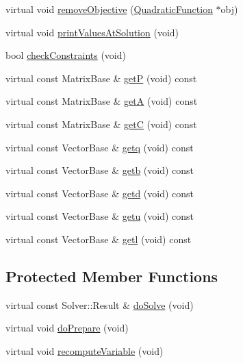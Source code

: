 \begin{DoxyCompactItemize}
\item 
virtual void \hyperlink{classocra_1_1CmlQuadraticSolver_a83d20013d6a9ff7c5855ee0ff2391190}{remove\+Objective} (\hyperlink{classocra_1_1QuadraticFunction}{Quadratic\+Function} $\ast$obj)
\item 
virtual void \hyperlink{classocra_1_1CmlQuadraticSolver_aed7554d599282ef5e8a7567b73b822b8}{print\+Values\+At\+Solution} (void)
\item 
bool \hyperlink{classocra_1_1CmlQuadraticSolver_a8077e7d9f2017f0f176324bb04cb5cd1}{check\+Constraints} (void)
\item 
virtual const Matrix\+Base \& \hyperlink{classocra_1_1CmlQuadraticSolver_afe5745b7cf19ebdfb03e389f3c7caf26}{getP} (void) const 
\item 
virtual const Matrix\+Base \& \hyperlink{classocra_1_1CmlQuadraticSolver_a897fe8f7810902839a21c3e0554955fc}{getA} (void) const 
\item 
virtual const Matrix\+Base \& \hyperlink{classocra_1_1CmlQuadraticSolver_a6d1565f39c221b87c96c5c45fc774f92}{getC} (void) const 
\item 
virtual const Vector\+Base \& \hyperlink{classocra_1_1CmlQuadraticSolver_a935b30cf759681642080816e0fafc46a}{getq} (void) const 
\item 
virtual const Vector\+Base \& \hyperlink{classocra_1_1CmlQuadraticSolver_a45a92a144756ac27d42df71c35cee6e2}{getb} (void) const 
\item 
virtual const Vector\+Base \& \hyperlink{classocra_1_1CmlQuadraticSolver_a019b100ad90b354172fe34ee9348de72}{getd} (void) const 
\item 
virtual const Vector\+Base \& \hyperlink{classocra_1_1CmlQuadraticSolver_abdc334ef769b905f3f11c334c908bd11}{getu} (void) const 
\item 
virtual const Vector\+Base \& \hyperlink{classocra_1_1CmlQuadraticSolver_a70598f6938791a748c600fd853553489}{getl} (void) const 
\end{DoxyCompactItemize}
\subsection*{Protected Member Functions}
\begin{DoxyCompactItemize}
\item 
virtual const Solver\+::\+Result \& \hyperlink{classocra_1_1CmlQuadraticSolver_aac5943e307225837253c470a931640ec}{do\+Solve} (void)
\item 
virtual void \hyperlink{classocra_1_1CmlQuadraticSolver_a6139c2cd572e403badc0451bf0ea9d90}{do\+Prepare} (void)
\item 
virtual void \hyperlink{classocra_1_1CmlQuadraticSolver_a2c2240bd0bcee4f0cd57030ed08baabd}{recompute\+Variable} (void)
\end{DoxyCompactItemize}
